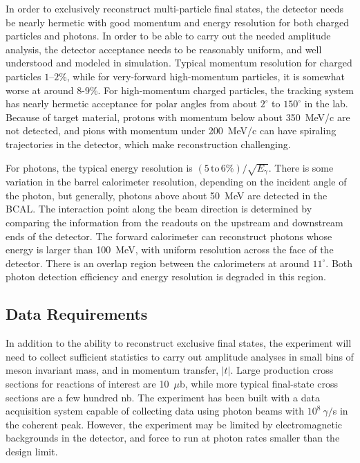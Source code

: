 In order to exclusively reconstruct multi-particle final states, the \GX{} detector needs be nearly
hermetic with good momentum and energy resolution for both charged particles and photons.
In order to be able to carry out the needed amplitude analysis, the detector acceptance  needs to 
be reasonably uniform, and well understood and modeled in simulation. Typical momentum resolution
for charged particles $1$--$2\%$, while for very-forward high-momentum particles, it is somewhat
worse at around $8$-$9\%$. For high-momentum charged particles, the tracking system has 
nearly hermetic acceptance for polar angles from about $2^{\circ}$ to $150^{\circ}$ in the lab. 
Because of target material, protons with momentum below about 350~MeV/c are not detected,
and pions with momentum under 200~MeV/c can have spiraling trajectories in the detector,
which make reconstruction challenging.

For photons, the typical energy resolution is $(5\,\mathrm{to}\,6\%)/\sqrt{E_{\gamma}}$. There is some 
variation in the barrel calorimeter resolution, depending on the incident angle of the photon,
but generally, photons above about 50~MeV are detected in the BCAL. The interaction point
along the beam direction is determined by comparing the information from the readouts on the 
upstream and downstream ends of the detector. The forward calorimeter can reconstruct photons
whose energy is larger than 100~MeV, with uniform resolution across the face of the detector.
There is an overlap region between the calorimeters at around $11^{\circ}$. Both photon detection 
efficiency and energy resolution is degraded in this region. 
 
\subsection{Data Requirements \label{sec:intro:data_requirements}}
In addition to the ability to reconstruct exclusive final states, the \GX{} experiment
will need to collect sufficient statistics to carry out amplitude analyses in small bins 
of meson invariant mass, and in momentum transfer, $|t|$. Large production cross
sections for reactions of interest are 10~$\mu$b, while more typical final-state 
cross sections are a few hundred nb. The \GX{} experiment has been built with a 
data acquisition system capable of collecting data using photon beams with $10^{8}~\gamma/$s
in the coherent peak. However, the experiment may be limited by electromagnetic backgrounds
in the detector, and force to run at photon  rates smaller than the design limit.

